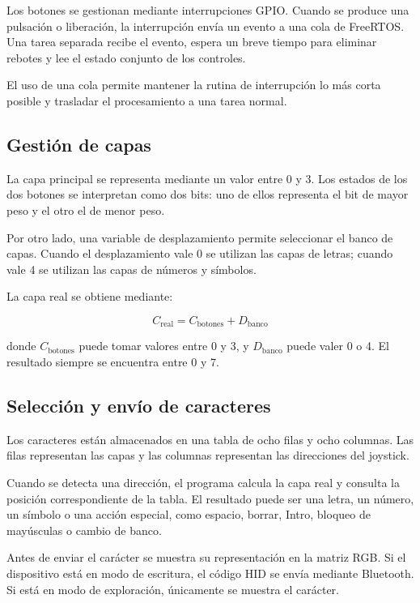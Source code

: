 Los botones se gestionan mediante interrupciones GPIO. Cuando se produce una pulsación o liberación, la interrupción envía un evento a una cola de FreeRTOS. Una tarea separada recibe el evento, espera un breve tiempo para eliminar rebotes y lee el estado conjunto de los controles.

El uso de una cola permite mantener la rutina de interrupción lo más corta posible y trasladar el procesamiento a una tarea normal.

\subsection{Gestión de capas}
\label{subsec:gestion-capas}

La capa principal se representa mediante un valor entre 0 y 3. Los estados de los dos botones se interpretan como dos bits: uno de ellos representa el bit de mayor peso y el otro el de menor peso.

Por otro lado, una variable de desplazamiento permite seleccionar el banco de capas. Cuando el desplazamiento vale 0 se utilizan las capas de letras; cuando vale 4 se utilizan las capas de números y símbolos.

La capa real se obtiene mediante:

\begin{equation}
    C_{\text{real}} = C_{\text{botones}} + D_{\text{banco}}
\end{equation}

donde \(C_{\text{botones}}\) puede tomar valores entre 0 y 3, y \(D_{\text{banco}}\) puede valer 0 o 4. El resultado siempre se encuentra entre 0 y 7.

\subsection{Selección y envío de caracteres}
\label{subsec:seleccion-envio}

Los caracteres están almacenados en una tabla de ocho filas y ocho columnas. Las filas representan las capas y las columnas representan las direcciones del joystick.

Cuando se detecta una dirección, el programa calcula la capa real y consulta la posición correspondiente de la tabla. El resultado puede ser una letra, un número, un símbolo o una acción especial, como espacio, borrar, Intro, bloqueo de mayúsculas o cambio de banco.

Antes de enviar el carácter se muestra su representación en la matriz RGB. Si el dispositivo está en modo de escritura, el código HID se envía mediante Bluetooth. Si está en modo de exploración, únicamente se muestra el carácter.

